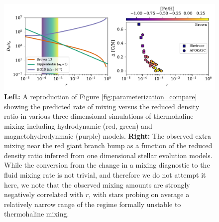 \begin{figure}[!tb]
\begin{center}
\includegraphics[width=\textwidth]{./figures/punchline/punchline.pdf}
\caption{\textbf{Left:} A reproduction of Figure \ref{fig:parameterization_compare} showing the predicted rate of mixing versus the reduced density ratio in various three dimensional simulations of thermohaline mixing including hydrodynamic (red, green) and magnetohydrodynmaic (purple) models. \textbf{Right:} The observed extra mixing near the red giant branch bump as a function of the reduced density ratio inferred from one dimensional stellar evolution models. While the conversion from the change in a mixing diagnostic to the fluid mixing rate is not trivial, and therefore we do not attempt it here, we note that the observed mixing amounts are strongly negatively correlated with $r$, with stars probing on average a relatively narrow range of the regime formally unstable to thermohaline mixing. }
\label{Fig:compare}
\end{center}
\end{figure}


